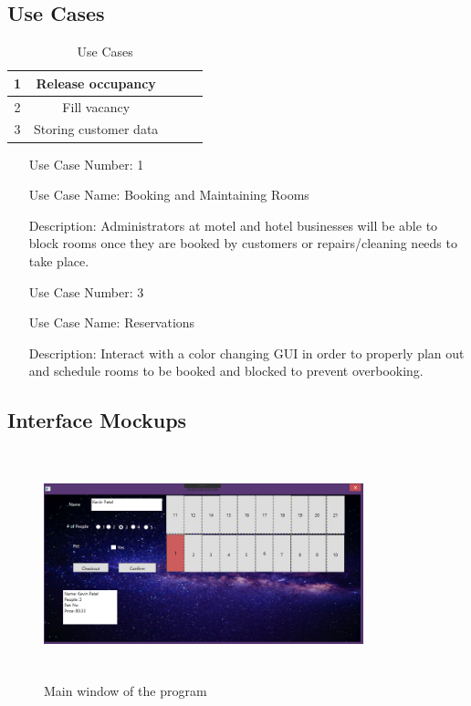\documentclass[10pt,conference,onecolumn,compsoc]{IEEEtran}
\begin{document}
\subsection{Use Cases}

\begin{table}
\centering
\begin{tabular}{|c|c|c|c|c|}
\hline
1 & Release occupancy\\
\hline \hline
2 & Fill vacancy\\ 
\hline \hline
3 & Storing customer data\\
\hline

\end{tabular}


\caption{\newline Use Cases}
\label{tab:useCaseIndex}
\end{table}


\begin{itemize}
\item[Use Case Number:] 1
\item[Use Case Name:] Booking and Maintaining Rooms
\item[Description:] Administrators at motel and hotel businesses will be able to block rooms once they are booked by customers or repairs/cleaning needs to take place.

\item[Use Case Number:] 3
\item[Use Case Name:] Reservations
\item[Description:] Interact with a color changing GUI in order to properly plan out and schedule rooms to be booked and blocked to prevent overbooking.
\end{itemize}

\subsection{Interface Mockups}
\begin{figure}[ht!]
\includegraphics[height=250px, width=350px]{Main.png}
\caption{Main window of the program}
\label{Interface}
\end{figure}
\end{document}
